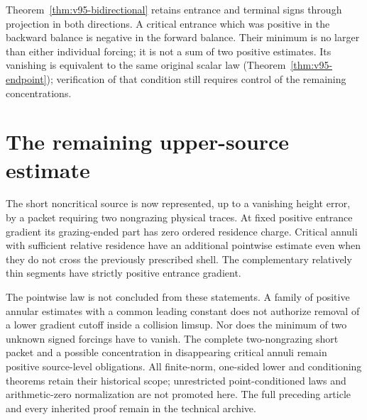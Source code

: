 \documentclass[11pt,reqno]{amsart}
\numberwithin{equation}{section}
\theoremstyle{definition}
\theoremstyle{remark}\newtheorem{remark}[theorem]{Remark}
\begin{document}
Theorem~\ref{thm:v95-bidirectional} retains entrance and terminal signs
through projection in both directions. A critical entrance which was
positive in the backward balance is negative in the forward balance.
Their minimum is no larger than either individual forcing; it is
not a sum of two positive estimates. Its vanishing is equivalent to the
same original scalar law (Theorem~\ref{thm:v95-endpoint}); verification
of that condition still requires control of the remaining concentrations.






\section{The remaining upper-source estimate}
The short noncritical source is now represented, up to a vanishing
height error, by a packet requiring two nongrazing physical traces.
At fixed positive entrance gradient its grazing-ended part has zero
ordered residence charge. Critical
annuli with sufficient relative residence have an additional
pointwise estimate even when they do not cross the previously
prescribed shell. The complementary relatively thin segments have
strictly positive entrance gradient.

The pointwise law is not concluded from these statements. A family
of positive annular estimates with a common leading constant does
not authorize removal of a lower gradient cutoff inside a collision
limsup. Nor does the minimum of two unknown signed forcings have to
vanish. The complete two-nongrazing short packet and a possible
concentration in disappearing critical annuli remain positive
source-level obligations. All finite-norm, one-sided lower and
conditioning theorems retain their historical scope; unrestricted
point-conditioned laws and arithmetic-zero normalization are not
promoted here. The full preceding article and every inherited proof
remain in the technical archive.

\appendix


\end{document}
